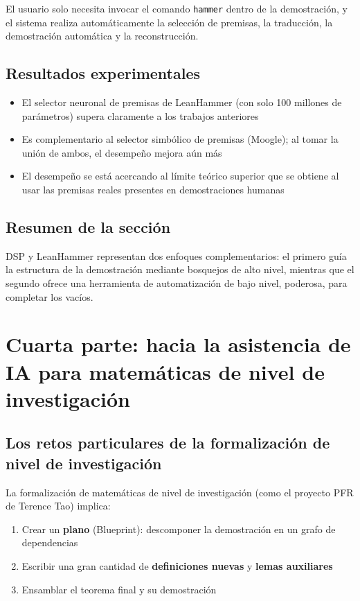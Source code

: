 \documentclass[a4paper]{article}
\begin{document}
El usuario solo necesita invocar el comando \texttt{hammer} dentro de la demostración, y el sistema realiza automáticamente la selección de premisas, la traducción, la demostración automática y la reconstrucción.

\subsection{Resultados experimentales}

\begin{itemize}
    \item El selector neuronal de premisas de LeanHammer (con solo 100 millones de parámetros) supera claramente a los trabajos anteriores
    \item Es complementario al selector simbólico de premisas (Moogle); al tomar la unión de ambos, el desempeño mejora aún más
    \item El desempeño se está acercando al límite teórico superior que se obtiene al usar las premisas reales presentes en demostraciones humanas
\end{itemize}

\subsection{Resumen de la sección}

DSP y LeanHammer representan dos enfoques complementarios: el primero guía la estructura de la demostración mediante bosquejos de alto nivel, mientras que el segundo ofrece una herramienta de automatización de bajo nivel, poderosa, para completar los vacíos.
\section{Cuarta parte: hacia la asistencia de IA para matemáticas de nivel de investigación}

\subsection{Los retos particulares de la formalización de nivel de investigación}

La formalización de matemáticas de nivel de investigación (como el proyecto PFR de Terence Tao) implica:
\begin{enumerate}
    \item Crear un \textbf{plano} (Blueprint): descomponer la demostración en un grafo de dependencias
    \item Escribir una gran cantidad de \textbf{definiciones nuevas} y \textbf{lemas auxiliares}
    \item Ensamblar el teorema final y su demostración
\end{enumerate}
\end{document}
